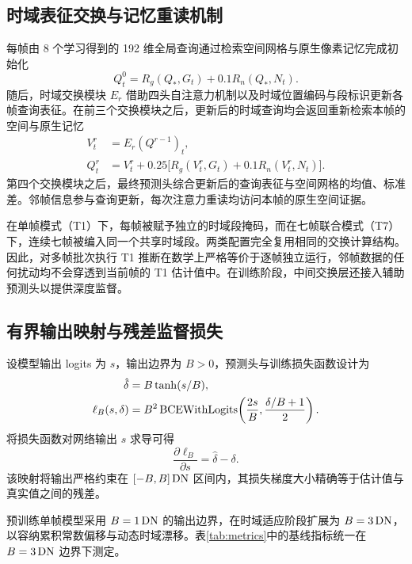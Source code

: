 \subsection{时域表征交换与记忆重读机制}
每帧由 8 个学习得到的 192 维全局查询通过检索空间网格与原生像素记忆完成初始化
\begin{equation}
 Q_t^0=R_g(Q_*,G_t)+0.1R_n(Q_*,N_t).
 \label{eq:initialread}
\end{equation}
随后，时域交换模块 $E_r$ 借助四头自注意力机制以及时域位置编码与段标识更新各帧查询表征。在前三个交换模块之后，更新后的时域查询均会返回重新检索本帧的空间与原生记忆
\begin{align}
 V_t^r&=E_r(Q^{r-1})_t,\nonumber\\
 Q_t^r&=V_t^r+0.25\big[R_g(V_t^r,G_t)
                 +0.1R_n(V_t^r,N_t)\big].
 \label{eq:reread}
\end{align}
第四个交换模块之后，最终预测头综合更新后的查询表征与空间网格的均值、标准差。邻帧信息参与查询更新，每次注意力重读均访问本帧的原生空间证据。

在单帧模式（T1）下，每帧被赋予独立的时域段掩码，而在七帧联合模式（T7）下，连续七帧被编入同一个共享时域段。两类配置完全复用相同的交换计算结构。因此，对多帧批次执行 T1 推断在数学上严格等价于逐帧独立运行，邻帧数据的任何扰动均不会穿透到当前帧的 T1 估计值中。在训练阶段，中间交换层还接入辅助预测头以提供深度监督。

\subsection{有界输出映射与残差监督损失}
设模型输出 logits 为 $s$，输出边界为 $B>0$，预测头与训练损失函数设计为
\begin{align}
 \hat\delta&=B\tanh(s/B),\label{eq:head}\\
 \ell_B(s,\delta)&=B^2\operatorname{BCEWithLogits}\!\left(\frac{2s}{B},\frac{\delta/B+1}{2}\right).
 \label{eq:loss}
\end{align}
将损失函数对网络输出 $s$ 求导可得
\begin{equation}
 \frac{\partial\ell_B}{\partial s}=\hat\delta-\delta.
 \label{eq:gradient}
\end{equation}
该映射将输出严格约束在 $[-B,B]\,\mathrm{DN}$ 区间内，其损失梯度大小精确等于估计值与真实值之间的残差。

预训练单帧模型采用 $B=1\,\mathrm{DN}$ 的输出边界，在时域适应阶段扩展为 $B=3\,\mathrm{DN}$，以容纳累积常数偏移与动态时域漂移。表\ref{tab:metrics}中的基线指标统一在 $B=3\,\mathrm{DN}$ 边界下测定。


